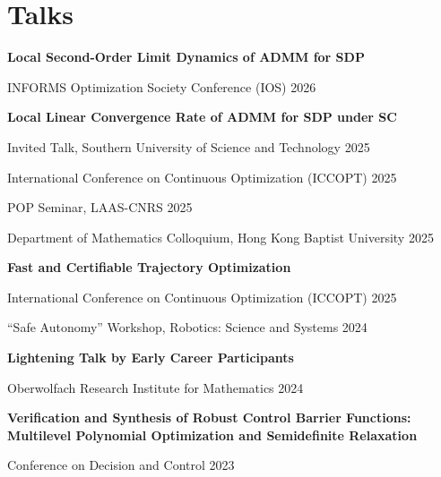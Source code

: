 
\section{\mysidestyle Talks}

\textbf{Local Second-Order Limit Dynamics of ADMM for SDP}

\vquad INFORMS Optimization Society Conference (IOS) \hfill 2026

\textbf{Local Linear Convergence Rate of ADMM for SDP under SC}

\vquad Invited Talk, Southern University of Science and Technology \hfill 2025

\vquad International Conference on Continuous Optimization (ICCOPT) \hfill 2025

\vquad POP Seminar, LAAS-CNRS \hfill 2025

\vquad Department of Mathematics Colloquium, Hong Kong Baptist University \hfill 2025

\textbf{Fast and Certifiable Trajectory Optimization}

\vquad International Conference on Continuous Optimization (ICCOPT) \hfill 2025

\vquad ``Safe Autonomy'' Workshop, Robotics: Science and Systems  \hfill 2024

\textbf{Lightening Talk by Early Career Participants}

\vquad Oberwolfach Research Institute for Mathematics \hfill 2024

\textbf{Verification and Synthesis of Robust Control Barrier Functions: Multilevel Polynomial Optimization and Semidefinite Relaxation}

\vquad Conference on Decision and Control \hfill 2023